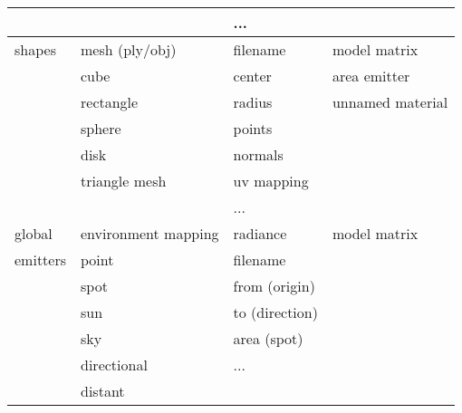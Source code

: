 \begin{center}
\begin{tabular}{ l | l | l | l }
			& 				& ...				&			\\ 
			\hline
    shapes		& mesh (ply/obj)		& filename			& model matrix		\\
			& cube				& center			& area emitter		\\
			& rectangle			& radius			& unnamed material	\\
			& sphere			& points			&			\\
			& disk				& normals			&			\\
			& triangle mesh			& uv mapping			&			\\
			& 				& ...				&			\\ 
			\hline
    global  & environment mapping		& radiance			& model matrix		\\
	emitters& point				& filename			& 			\\
			& spot				& from (origin)			&			\\
			& sun				& to (direction)		&			\\
			& sky				& area (spot)			&			\\
			& directional			& ...				&			\\
			& distant			&				&			\\			
			\hline
			
    \end{tabular}
\end{center}
\normalsize    